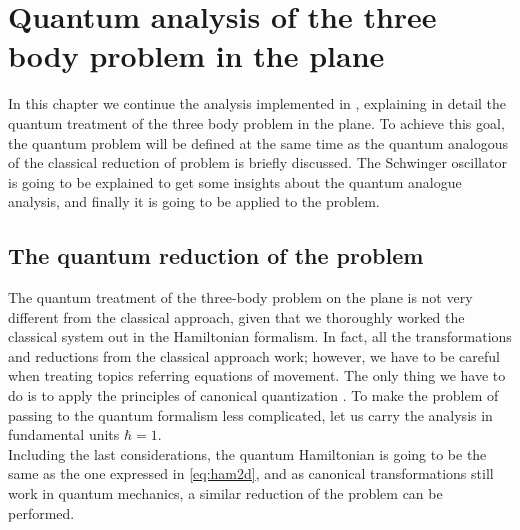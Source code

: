 \chapter{Quantum analysis of the three body problem in the plane}
In this chapter we continue the analysis implemented in \cite{alonso}, explaining in detail the quantum treatment of the three body problem in the plane. To achieve this goal, the quantum problem will be defined at the same time as the quantum analogous of the classical reduction of problem is briefly discussed. The Schwinger oscillator is going to be explained to get some insights about the quantum analogue analysis, and finally it is going to be applied to the problem.\\

\section{The quantum reduction of the problem}
The quantum treatment of the three-body problem on the plane is not very different from the classical approach, given that we thoroughly worked the classical system out in the Hamiltonian formalism. In fact, all the transformations and reductions from the classical approach work; however, we have to be careful when treating topics referring equations of movement.  The only thing we have to do is to apply the principles of canonical quantization \cite{Cq}. To make the problem of passing to the quantum formalism less complicated, let us carry the analysis in fundamental units $\hbar =1$. \\

Including the last considerations, the quantum Hamiltonian is going to be the same as the one expressed in \eqref{eq:ham2d}, and as canonical transformations still work in quantum mechanics, a similar reduction of the problem can be performed.\\


